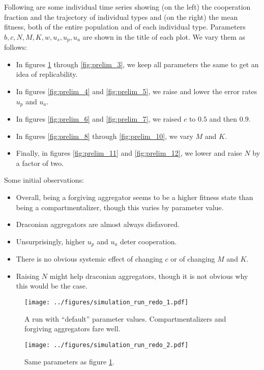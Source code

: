 \documentclass[13pt]{amsart}
\begin{document}
Following are some individual time series showing (on the left) the cooperation fraction and the trajectory of individual types and (on the right) the mean fitness, both of the entire population and of each individual type.
Parameters $b, c, N, M, K, w, u_s, u_p, u_a$ are shown in the title of each plot.
We vary them as follows:
\begin{itemize}
    \item In figures \ref{fig:prelim_1} through \ref{fig:prelim_3}, we keep all parameters the same to get an idea of replicability.
    \item In figures \ref{fig:prelim_4} and \ref{fig:prelim_5}, we raise and lower the error rates $u_p$ and $u_a$.
    \item In figures \ref{fig:prelim_6} and \ref{fig:prelim_7}, we raised $c$ to $0.5$ and then $0.9$.
    \item In figures \ref{fig:prelim_8} through \ref{fig:prelim_10}, we vary $M$ and $K$.
    \item Finally, in figures \ref{fig:prelim_11} and \ref{fig:prelim_12}, we lower and raise $N$ by a factor of two.
\end{itemize}

Some initial observations:
\begin{itemize}
    \item Overall, being a forgiving aggregator seems to be a higher fitness state than being a compartmentalizer, though this varies by parameter value.
    \item Draconian aggregators are almost always disfavored.
    \item Unsurprisingly, higher $u_p$ and $u_a$ deter cooperation.
    \item There is no obvious systemic effect of changing $c$ or of changing $M$ and $K$.
    \item Raising $N$ might help draconian aggregators, though it is not obvious why this would be the case.
\end{itemize}

\clearpage

\begin{figure}[h]
    \texttt{[image: ../figures/simulation\_run\_redo\_1.pdf]}
    \caption{A run with ``default'' parameter values.
    Compartmentalizers and forgiving aggregators fare well.}
    \label{fig:prelim_1}
\end{figure}

\begin{figure}[h]
    \texttt{[image: ../figures/simulation\_run\_redo\_2.pdf]}
    \caption{Same parameters as figure \ref{fig:prelim_1}.}
    \label{fig:prelim_2}
\end{figure}
\end{document}

